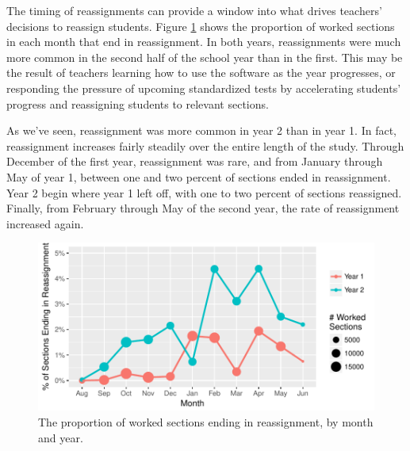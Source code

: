 \documentclass[12pt]{article}\usepackage[]{graphicx}\usepackage[]{color}
\makeatletter
\def\maxwidth{ %
  \ifdim\Gin@nat@width>\linewidth
    \linewidth
  \else
    \Gin@nat@width
  \fi
}
\makeatother
\begin{document}
The timing of reassignments can provide a window into what drives
teachers' decisions to reassign students.
Figure \ref{fig:byMonth} shows the proportion of worked sections in
each month that end in reassignment.
In both years, reassignments were much more common in the second half
of the school year than in the first.
This may be the result of teachers learning how to use the software as
the year progresses, or responding the pressure of upcoming
standardized tests by accelerating students' progress and reassigning
students to relevant sections.

As we've seen, reassignment was more common in year 2 than in year 1.
In fact, reassignment increases fairly steadily over the entire length
of the study.
Through December of the first year, reassignment was rare, and from
January through May of year 1, between one and two percent of sections
ended in reassignment.
Year 2 begin where year 1 left off, with one to two percent of
sections reassigned.
Finally, from February through May of the second year, the rate of
reassignment increased again.



\begin{figure}
  \centering

\includegraphics[width=\maxwidth]{figure/byMonth-1} 

\caption{The proportion of worked sections ending in reassignment, by
  month and year.}
\label{fig:byMonth}
\end{figure}
\end{document}
